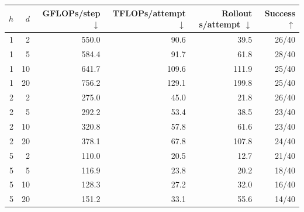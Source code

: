 \begin{tabular}{@{}rrrrrr@{}}
\toprule
$h$ & $d$ & GFLOPs/step $\downarrow$ & TFLOPs/attempt $\downarrow$ & Rollout s/attempt $\downarrow$ & Success $\uparrow$\\
\midrule
1 & 2 & 550.0 & 90.6 & 39.5 & 26/40\\
1 & 5 & 584.4 & 91.7 & 61.8 & 28/40\\
1 & 10 & 641.7 & 109.6 & 111.9 & 25/40\\
1 & 20 & 756.2 & 129.1 & 199.8 & 25/40\\
2 & 2 & 275.0 & 45.0 & 21.8 & 26/40\\
2 & 5 & 292.2 & 53.4 & 38.5 & 23/40\\
2 & 10 & 320.8 & 57.8 & 61.6 & 23/40\\
2 & 20 & 378.1 & 67.8 & 107.8 & 24/40\\
5 & 2 & 110.0 & 20.5 & 12.7 & 21/40\\
5 & 5 & 116.9 & 23.8 & 20.2 & 18/40\\
5 & 10 & 128.3 & 27.2 & 32.0 & 16/40\\
5 & 20 & 151.2 & 33.1 & 55.6 & 14/40\\
\bottomrule
\end{tabular}
